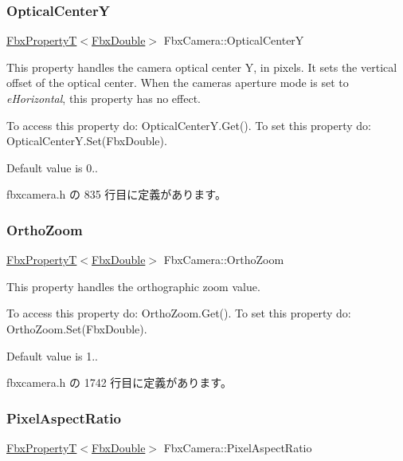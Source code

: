 \subsubsection{\texorpdfstring{Optical\+CenterY}{OpticalCenterY}}
{\footnotesize\ttfamily \hyperlink{class_fbx_property_t}{Fbx\+PropertyT}$<$\hyperlink{fbxtypes_8h_a171e72a1c46fc15c1a6c9c31948c1c5b}{Fbx\+Double}$>$ Fbx\+Camera\+::\+Optical\+CenterY}

This property handles the camera optical center Y, in pixels. It sets the vertical offset of the optical center. When the camera\textquotesingle{}s aperture mode is set to {\itshape e\+Horizontal}, this property has no effect.

To access this property do\+: Optical\+Center\+Y.\+Get(). To set this property do\+: Optical\+Center\+Y.\+Set(\+Fbx\+Double).

Default value is 0.. 

 fbxcamera.\+h の 835 行目に定義があります。

\mbox{\label{class_fbx_camera_a038fab99051fa0171f60f40469eff7cc}} 
\subsubsection{\texorpdfstring{Ortho\+Zoom}{OrthoZoom}}
{\footnotesize\ttfamily \hyperlink{class_fbx_property_t}{Fbx\+PropertyT}$<$\hyperlink{fbxtypes_8h_a171e72a1c46fc15c1a6c9c31948c1c5b}{Fbx\+Double}$>$ Fbx\+Camera\+::\+Ortho\+Zoom}

This property handles the orthographic zoom value.

To access this property do\+: Ortho\+Zoom.\+Get(). To set this property do\+: Ortho\+Zoom.\+Set(\+Fbx\+Double).

Default value is 1.. 

 fbxcamera.\+h の 1742 行目に定義があります。

\mbox{\label{class_fbx_camera_a3fbab252bb6925578cc965f0383592b8}} 
\subsubsection{\texorpdfstring{Pixel\+Aspect\+Ratio}{PixelAspectRatio}}
{\footnotesize\ttfamily \hyperlink{class_fbx_property_t}{Fbx\+PropertyT}$<$\hyperlink{fbxtypes_8h_a171e72a1c46fc15c1a6c9c31948c1c5b}{Fbx\+Double}$>$ Fbx\+Camera\+::\+Pixel\+Aspect\+Ratio}

